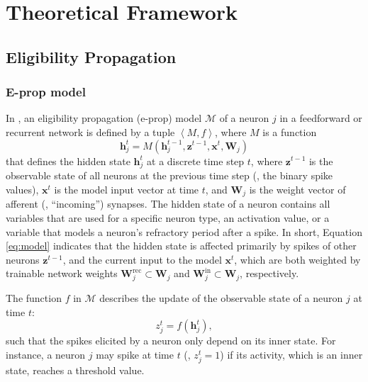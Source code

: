 \chapter{Theoretical Framework}\label{ch:relatedwork}

\section{Eligibility Propagation}

    \subsection{E-prop model}
        In \citet{bellec2020solution}, an eligibility propagation (e-prop) model $\mathcal{M}$ of a neuron $j$ in a feedforward or recurrent network is defined by a tuple $\left<M, f\right>$,
        where $M$ is a function
        \begin{equation}\label{eq:model}
        \mathbf{h}^t_j = M\left(\mathbf{h}_j^{t-1}, \mathbf{z}^{t-1}, \mathbf{x}^t, \mathbf{W}_j\right)
        \end{equation}
        that defines the hidden state $\mathbf{h}_j^t$ at a discrete time step $t$, where $\mathbf{z}^{t-1}$ is the observable state of all neurons at the previous time step (\ie, the binary spike values), $\mathbf{x}^t$ is the model input vector at time $t$, and $\mathbf{W}_j$ is the weight vector of afferent (\ie, ``incoming'') synapses.
        The hidden state of a neuron contains all variables that are used for a specific neuron type, \eg an activation value, or a variable that models a neuron's refractory period after a spike.
        In short, Equation \ref{eq:model} indicates that the hidden state is affected primarily by spikes of other neurons $\mathbf{z}^{t-1}$, and the current input to the model $\mathbf{x}^t$, which are both weighted by trainable network weights $\mathbf{W}^\text{rec}_j \subset \mathbf{W}_j$ and $\mathbf{W}^\text{in}_j \subset \mathbf{W}_j$, respectively.

        The function $f$ in $\mathcal{M}$ describes the update of the observable state of a neuron $j$ at time $t$:
        \begin{equation}\label{eq:observable}
        z^t_j = f\left(\mathbf{h}_j^t\right),
        \end{equation}
        such that the spikes elicited by a neuron only depend on its inner state.
        For instance, a neuron $j$ may spike at time $t$ (\ie, $z^t_j = 1$) if its activity, which is an inner state, reaches a threshold value.

